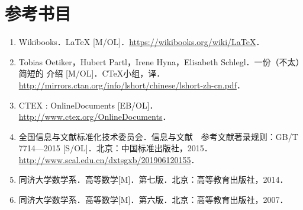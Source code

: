 \chapter{参考书目}
%
\begin{enumerate}
	\item Wikibooks．LaTeX [M/OL]．\url{https://wikibooks.org/wiki/LaTeX}．
	\item Tobias Oetiker，Hubert Partl，Irene Hyna，Elisabeth Schlegl．一份（不太）简短的 \LaTeXe 介绍 [M/OL]．C\TeX 小组，译．\newline
	      \url{http://mirrors.ctan.org/info/lshort/chinese/lshort-zh-cn.pdf}．
	\item CTEX : OnlineDocuments [EB/OL]．\url{http://www.ctex.org/OnlineDocuments}．
	\item 全国信息与文献标准化技术委员会．信息与文献　参考文献著录规则：GB/T 7714—2015 [S/OL]．北京：中国标准出版社，2015．\newline
	      \url{http://www.scal.edu.cn/dxtsgxb/201906120155}．
	\item 同济大学数学系．高等数学[M]．第七版．北京：高等教育出版社，2014．
	\item 同济大学数学系．高等数学[M]．第六版．北京：高等教育出版社，2007．
\end{enumerate}
%


